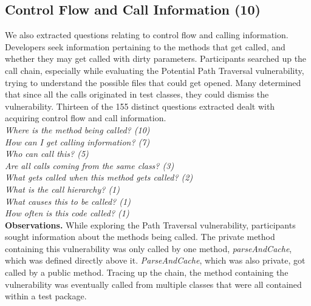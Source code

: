 \documentclass[conference]{IEEEtran}
\begin{document}
\noindent\subsection{\textbf{Control Flow and Call Information (10)}}\label{cf}
We also extracted questions relating to control flow and calling information. 
Developers seek information pertaining to the methods that get called, and whether they may get called with dirty parameters.
Participants searched up the call chain, especially while evaluating the Potential Path Traversal vulnerability, trying to understand the possible files that could get opened. 
Many determined that since all the calls originated in test classes, they could dismiss the vulnerability.
Thirteen of the 155 distinct questions extracted dealt with acquiring control flow and call information.
\\


\noindent\emph{Where is the method being called? (10)} \\
\emph{How can I get calling information? (7)} \\
\emph{Who can call this? (5)} \\
\emph{Are all calls coming from the same class? (3)} \\
\emph{What gets called when this method gets called? (2)} \\
\emph{What is the call hierarchy? (1)} \\
\emph{What causes this to be called? (1)} \\
\emph{How often is this code called? (1)} \\


\noindent\textbf{Observations.}
While exploring the Path Traversal vulnerability, participants sought information about the methods being called. 
The private method containing this vulnerability was only called by one method, \textit{parseAndCache}, which was defined directly above it. \textit{ParseAndCache}, which was also private, got called by a public method. Tracing up the chain, the method containing the vulnerability was eventually called from multiple classes that were all contained within a test package.
\end{document}
